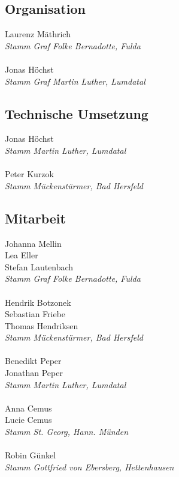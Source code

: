 \begin{centering}
\begin{multicols}{2}

\subsection*{Organisation}
Laurenz Mäthrich \\ \textit{Stamm Graf Folke Bernadotte, Fulda} \\ ~\\
Jonas Höchst \\ \textit{Stamm Graf Martin Luther, Lumdatal}

\subsection*{Technische Umsetzung}
Jonas Höchst \\ \textit{Stamm Martin Luther, Lumdatal} \\ ~\\
Peter Kurzok \\ \textit{Stamm Mückenstürmer, Bad Hersfeld}

\subsection*{Mitarbeit}
Johanna Mellin \\ Lea Eller \\ Stefan Lautenbach \\ \textit{Stamm Graf Folke Bernadotte, Fulda} \\ ~\\
Hendrik Botzonek \\ Sebastian Friebe \\ Thomas Hendriksen \\ \textit{Stamm Mückenstürmer, Bad Hersfeld} \\ ~\\
Benedikt Peper \\ Jonathan Peper \\ \textit{Stamm Martin Luther, Lumdatal} \\ ~\\
Anna Cemus \\ Lucie Cemus \\ \textit{Stamm St. Georg, Hann. Münden} \\ ~\\
Robin Günkel \\ \textit{Stamm Gottfried von Ebersberg, Hettenhausen} \\


\end{multicols}
\end{centering}
